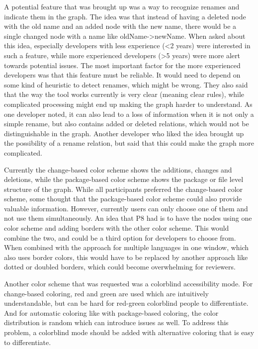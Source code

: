 \documentclass[a4paper,11pt,twoside]{article}
\theoremstyle{definition} %
\begin{document}
A potential feature that was brought up was a way to recognize renames and indicate them in the graph. The idea was that instead of having a deleted node with the old name and an added node with the new name, there would be a single changed node with a name like oldName->newName. When asked about this idea, especially developers with less experience (<2 years) were interested in such a feature, while more experienced developers (>5 years) were more alert towards potential issues. The most important factor for the more experienced developers was that this feature must be reliable. It would need to depend on some kind of heuristic to detect renames, which might be wrong. They also said that the way the tool works currently is very clear (meaning clear rules), while complicated processing might end up making the graph harder to understand. As one developer noted, it can also lead to a loss of information when it is not only a simple rename, but also contains added or deleted relations, which would not be distinguishable in the graph. Another developer who liked the idea brought up the possibility of a rename relation, but said that this could make the graph more complicated. 

Currently the change-based color scheme shows the additions, changes and deletions, while the package-based color scheme shows the package or file level structure of the graph. While all participants preferred the change-based color scheme, some thought that the package-based color scheme could also provide valuable information. However, currently users can only choose one of them and not use them simultaneously. An idea that P8 had is to have the nodes using one color scheme and adding borders with the other color scheme. This would combine the two, and could be a third option for developers to choose from. When combined with the approach for multiple languages in one window, which also uses border colors, this would have to be replaced by another approach like dotted or doubled borders, which could become overwhelming for reviewers. 

Another color scheme that was requested was a colorblind accessibility mode. For change-based coloring, red and green are used which are intuitively understandable, but can be hard for red-green colorblind people to differentiate. And for automatic coloring like with package-based coloring, the color distribution is random which can introduce issues as well. To address this problem, a colorblind mode should be added with alternative coloring that is easy to differentiate. 
\end{document}
